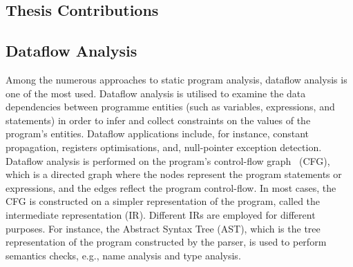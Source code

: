 \subsection{Thesis Contributions}




\subsection{Dataflow Analysis}
Among the numerous approaches to static program analysis, dataflow analysis is one of the most used.
Dataflow analysis is utilised to examine the data dependencies between programme entities
(such as variables, expressions, and statements) in order to infer and collect constraints
on the values of the program's entities. Dataflow applications include, for instance,
constant propagation, registers optimisations, and, null-pointer exception detection.
Dataflow analysis is performed on the program's control-flow graph~\cite{allen1970control} (CFG), which is a
directed graph where the nodes represent the program statements or expressions,
and the edges reflect the program control-flow. 
In most cases, the CFG is constructed on a simpler representation of the program, called the intermediate representation (IR).
Different IRs are employed for different purposes. For instance, the Abstract Syntax Tree (AST), which
is the tree representation of the program constructed by the parser, is used to perform semantics checks, e.g.,
name analysis and type analysis.



